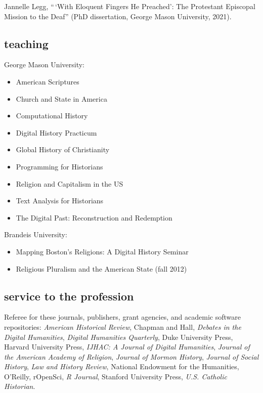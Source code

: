 \documentclass[11pt]{article}
\providecommand{\tightlist}{%
  \setlength{\itemsep}{0pt}\setlength{\parskip}{0pt}}
\begin{document}
Jannelle Legg, ``\,`With Eloquent Fingers He Preached': 
The Protestant Episcopal Mission to the Deaf'' (PhD dissertation, George Mason University, 2021).

\subsection{teaching}\label{teaching}

George Mason University:

\vspace{-0.15in}

\begin{itemize}
    \tightlist
  \item American Scriptures 
  \item Church and State in America
  \item Computational History 
  \item Digital History Practicum
  \item Global History of Christianity 
  \item Programming for Historians 
  \item Religion and Capitalism in the US 
  \item Text Analysis for Historians 
  \item The Digital Past: Reconstruction and Redemption
\end{itemize}

\vspace{-0.1in}

Brandeis University:

\vspace{-0.15in}

\begin{itemize}
    \tightlist
  \item
    Mapping Boston's Religions: A Digital History Seminar 
  \item
    Religious Pluralism and the American State (fall 2012)
\end{itemize}

\subsection{service to the profession}\label{service-profession}

Referee for these journals, publishers, grant agencies, and academic software 
repositories: \emph{American Historical Review}, Chapman and Hall, 
\emph{Debates in the Digital Humanities}, \emph{Digital Humanities Quarterly}, 
Duke University Press, Harvard University Press, \emph{IJHAC: A Journal of 
  Digital Humanities}, \emph{Journal of the American Academy of Religion}, 
\emph{Journal of Mormon History}, \emph{Journal of Social History}, \emph{Law 
  and History Review}, National Endowment for the Humanities, O'Reilly, 
rOpenSci, \emph{R Journal}, Stanford University Press, \emph{U.S. Catholic
Historian}.
\end{document}
